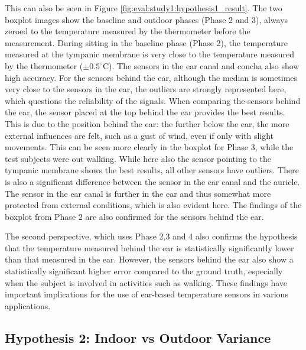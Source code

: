 This can also be seen in Figure \ref{fig:eval:study1:hypothesis1_result}.
The two boxplot images show the baseline and outdoor phases (Phase 2 and 3), always zeroed to the temperature measured by the thermometer before the measurement.
During sitting in the baseline phase (Phase 2), the temperature measured at the tympanic membrane is very close to the temperature measured by the thermometer ($\pm0.5^\circ\text{C}$). 
The sensors in the ear canal and concha also show high accuracy. 
For the sensors behind the ear, although the median is sometimes very close to the sensors in the ear, the outliers are strongly represented here, which questions the reliability of the signals.
When comparing the sensors behind the ear, the sensor placed at the top behind the ear provides the best results. 
This is due to the position behind the ear: the further below the ear, the more external influences are felt, such as a gust of wind, even if only with slight movements.
This can be seen more clearly in the boxplot for Phase 3, while the test subjects were out walking. 
While here also the sensor pointing to the tympanic membrane shows the best results, all other sensors have outliers.
There is also a significant difference between the sensor in the ear canal and the auricle. 
The sensor in the ear canal is further in the ear and thus somewhat more protected from external conditions, which is also evident here. 
The findings of the boxplot from Phase 2 are also confirmed for the sensors behind the ear.

The second perspective, which uses Phase 2,3 and 4 also confirms the hypothesis that the temperature measured behind the ear is statistically significantly lower than that measured in the ear. 
However, the sensors behind the ear also show a statistically significant higher error compared to the ground truth, especially when the subject is involved in activities such as walking. 
These findings have important implications for the use of ear-based temperature sensors in various applications.

\subsection{Hypothesis 2: Indoor vs Outdoor Variance}
\label{subsec:Evaluation:Study2:Hypothesis2}

